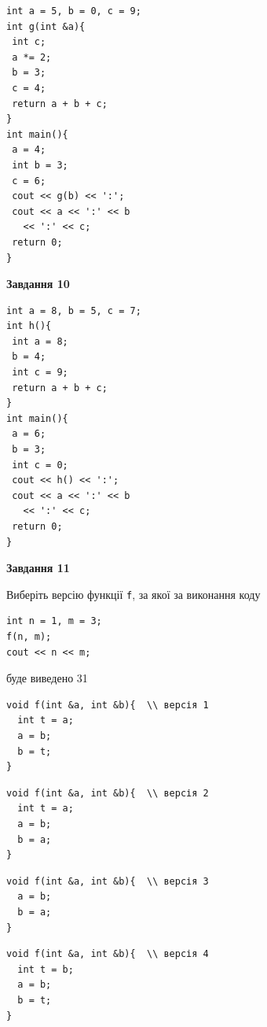 \documentclass[12pt, ukrainian]{article}
\def\code#1{\Verb!#1!}
\begin{document}
{\begin {large}
\begin{minipage}[t]{7.0cm}
\begin{verbatim}
int a = 5, b = 0, c = 9;
int g(int &a){
 int c;
 a *= 2;
 b = 3;
 c = 4;
 return a + b + c;
}
int main(){
 a = 4;
 int b = 3;
 c = 6;
 cout << g(b) << ':';
 cout << a << ':' << b 
   << ':' << c;
 return 0;
}
\end{verbatim}



\begin{center}
\textbf{Завдання 10}
\end{center}
\vspace{-8mm}

\begin{verbatim}
int a = 8, b = 5, c = 7;
int h(){
 int a = 8;
 b = 4;
 int c = 9;
 return a + b + c;
}
int main(){
 a = 6;
 b = 3;
 int c = 0;
 cout << h() << ':';
 cout << a << ':' << b 
   << ':' << c;
 return 0;
}
\end{verbatim}

\end{minipage}
\vline \hspace{1mm}
\begin{minipage}[t]{11.0cm}

\begin{center}
\textbf{Завдання 11}
\end{center}
Виберіть версію функції \code{f}, за якої за виконання коду
\begin{verbatim}
int n = 1, m = 3;
f(n, m);
cout << n << m;
\end{verbatim}

буде виведено 31

\begin{verbatim}
void f(int &a, int &b){  \\ версія 1
  int t = a;
  a = b;
  b = t;
}
\end{verbatim}

\vspace{-8mm}\begin{verbatim}
void f(int &a, int &b){  \\ версія 2
  int t = a;
  a = b;
  b = a;
}
\end{verbatim}

\vspace{-8mm}\begin{verbatim}
void f(int &a, int &b){  \\ версія 3
  a = b;
  b = a;
}
\end{verbatim}

\vspace{-8mm}\begin{verbatim}
void f(int &a, int &b){  \\ версія 4
  int t = b;
  a = b;
  b = t;
}
\end{verbatim}




\end{minipage}
\end{large}}
\end{document}

